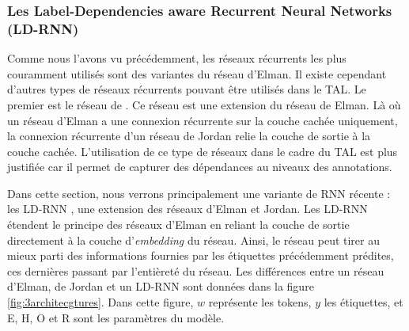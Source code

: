 \documentclass[12pt,a4paper,times,twoside,openright]{report}
\begin{document}
            
            \subsubsection{Les Label-Dependencies aware Recurrent Neural Networks (LD-RNN)}
            \label{subsubsec:LD-RNN}
Comme nous l'avons vu précédemment, les réseaux récurrents les plus couramment utilisés sont des variantes du réseau d'Elman. Il existe cependant d'autres types de réseaux récurrents pouvant être utilisés dans le TAL. Le premier est le réseau de \citet{jordan1986serial}. Ce réseau est une extension du réseau de Elman. Là où un réseau d'Elman a une connexion récurrente sur la couche cachée uniquement, la connexion récurrente d'un réseau de Jordan relie la couche de sortie à la couche cachée. L'utilisation de ce type de réseaux dans le cadre du TAL est plus justifiée car il permet de capturer des dépendances au niveaux des annotations.

Dans cette section, nous verrons principalement une variante de RNN récente : les LD-RNN \citep{dinarelli2016etude,dupont2017a}, une extension des réseaux d'Elman et Jordan. Les LD-RNN étendent le principe des réseaux d'Elman en reliant la couche de sortie directement à la couche d'\textit{embedding} du réseau. Ainsi, le réseau peut tirer au mieux parti des informations fournies par les étiquettes précédemment prédites, ces dernières passant par l'entièreté du réseau. Les différences entre un réseau d'Elman, de Jordan et un LD-RNN sont données dans la figure \ref{fig:3architecgtures}. Dans cette figure, $w$ représente les tokens, $y$ les étiquettes, et E, H, O et R sont les paramètres du modèle.
\end{document}
